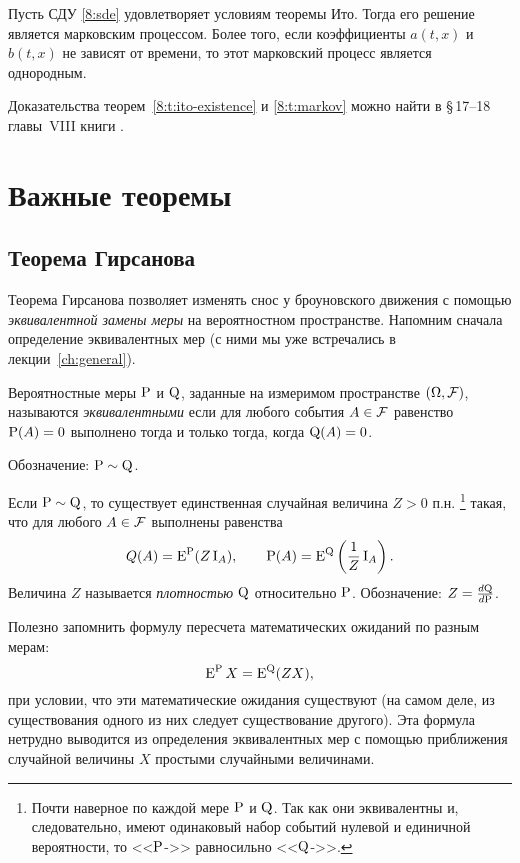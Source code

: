 \begin{theorem}
\label{8:t:markov}
Пусть СДУ \eqref{8:sde} удовлетворяет условиям теоремы Ито.
Тогда его решение является марковским процессом.
Более того, если коэффициенты $a(t,x)$ и $b(t,x)$ не зависят от времени, то этот марковский процесс является однородным.
\end{theorem}

\noindent
Доказательства теорем~\ref{8:t:ito-existence} и \ref{8:t:markov} можно найти в \S\,17--18 главы~VIII книги \cite{BulinskiShiryaev04}.


\section{Важные теоремы}

\subsection{Теорема Гирсанова}
\label{ito-pr:ss:girsanov}
Теорема Гирсанова позволяет изменять снос у броуновского движения с помощью \emph{эквивалентной замены меры} на вероятностном пространстве. 
Напомним сначала определение эквивалентных мер (с ними мы уже встречались в лекции~\ref{ch:general}).

\begin{definition}
Вероятностные меры $\P$ и $\Q$, заданные на измеримом пространстве $(\Omega,\F)$, называются \emph{эквивалентными} если для любого события $A\in\F$ равенство $\P(A)=0$ выполнено тогда и только тогда, когда $\Q(A)=0$.

Обозначение: $\P\sim\Q$.
\end{definition}

\begin{proposition}
Если $\P\sim\Q$, то существует единственная случайная величина $Z>0$ п.н.%
\footnote{Почти наверное по каждой мере $\P$ и $\Q$.
Так как они эквивалентны и, следовательно, имеют одинаковый набор событий нулевой и единичной вероятности, то <<$\P$-\as>> равносильно <<$\Q$-\as>>.}
такая, что для любого $A\in \F$ выполнены равенства
\[
Q(A) = \E^{\P}(Z\I_A), \qquad \P(A) = \E^{\Q}\left(\frac{1}{Z}\I_A\right).
\]
Величина $Z$ называется \emph{плотностью} $\Q$ относительно $\P$. Обозначение: $Z = \frac{d\Q}{d\P}$.
\end{proposition}

Полезно запомнить формулу пересчета математических ожиданий по разным мерам:
\[
\E^{\P} X = \E^{\Q} (ZX),
\]
при условии, что эти математические ожидания существуют (на самом деле, из существования одного из них следует существование другого).
Эта формула нетрудно выводится из определения эквивалентных мер с помощью приближения случайной величины $X$ простыми случайными величинами.

